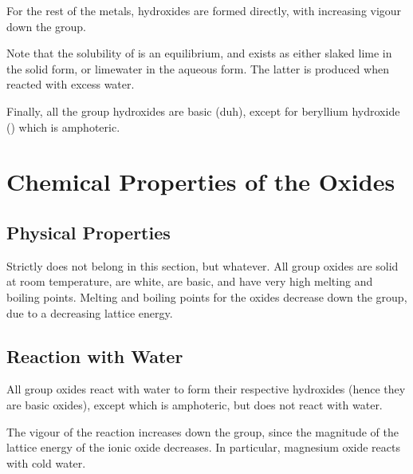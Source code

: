 			For the rest of the metals, hydroxides are formed directly, with increasing vigour down the group.


			Note that the solubility of  is an equilibrium, and exists as either slaked lime in
			the solid form, or limewater in the aqueous form. The latter is produced when reacted with excess
			water.

			Finally, all the group \rtwo{} hydroxides are basic (duh), except for beryllium hydroxide
			() which is amphoteric.




	\pagebreak
	\section{Chemical Properties of the Oxides}

		\subsection{Physical Properties}

			Strictly does not belong in this section, but whatever. All group \rtwo{} oxides are solid at room
			temperature, are white, are basic, and have very high melting and boiling points. Melting and
			boiling points for the oxides decrease down the group, due to a decreasing lattice energy.



		\subsection{Reaction with Water}

			All group \rtwo{} oxides react with water to form their respective hydroxides (hence they are basic
			oxides), except  which is amphoteric, but does not react with water.

			The vigour of the reaction increases down the group, since the magnitude of the lattice energy
			of the ionic oxide decreases. In particular, magnesium oxide reacts  with cold water.


